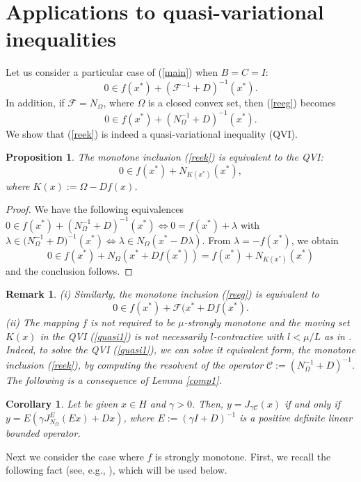 \documentclass[11pt]{article}
\def\beq{\begin{equation}}
\def\eeq{\end{equation}}
\theoremstyle{plain}
\newtheorem{remark}{Remark}
\newtheorem{corollary}[theorem]{Corollary}
\newtheorem{proposition}[theorem]{Proposition}
\begin{document}
{\section{Applications to quasi-variational inequalities}\label{sec4}
 Let us consider a particular case of   (\ref{main}) when $B=C=I$:
  \beq\label{reeg}
 0 \in f(x^*)+(\mathcal{F}^{-1}+D)^{-1}(x^*).
 \eeq
 In addition, if  $\mathcal{F}=N_{\Omega}$, where $\Omega$ is a closed convex set, then (\ref{reeg})  becomes 
 \beq\label{reek}
 0 \in f(x^*)+(N_\Omega^{-1}+D)^{-1}(x^*).
 \eeq
 We show that (\ref{reek}) is indeed a quasi-variational inequality (QVI). 
\begin{proposition} \label{equi}The monotone inclusion (\ref{reek}) is equivalent to the QVI:
  \beq\label{quasi1}
 0 \in   f(x^*)+N_{K(x^*)}(x^*),
\eeq 
where $K(x):=\Omega -Df(x)$.
\end{proposition}

\begin{proof}
{{We have the following equivalences}}
$0 \in f(x^*)+(N_\Omega^{-1}+D)^{-1}(x^*) \Leftrightarrow 0 =  f(x^*)+\lambda$ {{with}} $\lambda \in {{(N_\Omega^{-1}}}+D)^{-1}(x^*)\Leftrightarrow \lambda \in N_\Omega(x^*-D\lambda)$. From $\lambda=-  f(x^*)$, we obtain 
$$
 0 \in  f(x^*)+N_{\Omega}(x^*+Df(x^*))= f(x^*)+N_{K(x^*)}(x^*)
$$
and the conclusion follows. 
\end{proof}
\begin{remark}
(i) Similarly, the monotone inclusion (\ref{reeg}) is equivalent to
  \beq\label{reeg1}
 0 \in f(x^*)+\mathcal{F}(x^*+Df(x^*).
 \eeq
(ii) The mapping $f$ is not required to be $\mu$-strongly monotone and  the moving set $K(x)$ in the QVI (\ref{quasi1}) is not necessarily   $l$-contractive with $l<\mu/L$ as in \cite{al1,Nesterov}.  Indeed, to solve the QVI (\ref{quasi1}), we can solve it equivalent form, the monotone inclusion (\ref{reek}), by computing the resolvent of the operator $\mathcal{C}:=(N_\Omega^{-1}+D)^{-1}$. The following is a consequence of Lemma \ref{comp1}.
\end{remark}
 \begin{corollary}\label{comp2}
Let be given $x\in H$ and $\gamma>0$. Then, $y=J_{\gamma \mathcal{C}}(x)$ {{if and only if }}  $y=E(\gamma J_{N_\Omega}^E(Ex)+Dx)$, where $E:=(\gamma I+D)^{-1}$ is a positive definite linear bounded operator. 
\end{corollary}

Next we consider the case where $f$ is strongly monotone. First, we recall {{the following fact (see, e.g.,    \cite{IT}), which will be used below}}.

}
\end{document}
